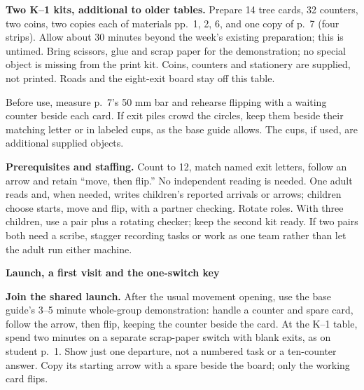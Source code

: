 \documentclass[11pt]{article}
\newcommand{\head}[1]{\par\textbf{\large #1}\par}
\begin{document}
\textbf{Two K--1 kits, additional to older tables.} Prepare 14 tree cards, 32 counters, two coins, two copies each of materials pp.\ 1, 2, 6, and one copy of p.\ 7 (four strips). Allow about 30 minutes beyond the week's existing preparation; this is untimed. Bring scissors, glue and scrap paper for the demonstration; no special object is missing from the print kit. Coins, counters and stationery are supplied, not printed. Roads and the eight-exit board stay off this table.

Before use, measure p.\ 7's 50 mm bar and rehearse flipping with a waiting counter beside each card. If exit piles crowd the circles, keep them beside their matching letter or in labeled cups, as the base guide allows. The cups, if used, are additional supplied objects.

\textbf{Prerequisites and staffing.} Count to 12, match named exit letters, follow an arrow and retain ``move, then flip.'' No independent reading is needed. One adult reads and, when needed, writes children’s reported arrivals or arrows; children choose starts, move and flip, with a partner checking. Rotate roles. With three children, use a pair plus a rotating checker; keep the second kit ready. If two pairs both need a scribe, stagger recording tasks or work as one team rather than let the adult run either machine.
\newpage

\head{Launch, a first visit and the one-switch key}
\textbf{Join the shared launch.} After the usual movement opening, use the base guide's 3--5 minute whole-group demonstration: handle a counter and spare card, follow the arrow, then flip, keeping the counter beside the card. At the K--1 table, spend two minutes on a separate scrap-paper switch with blank exits, as on student p.\ 1. Show just one departure, not a numbered task or a ten-counter answer. Copy its starting arrow with a spare beside the board; only the working card flips.
\end{document}
